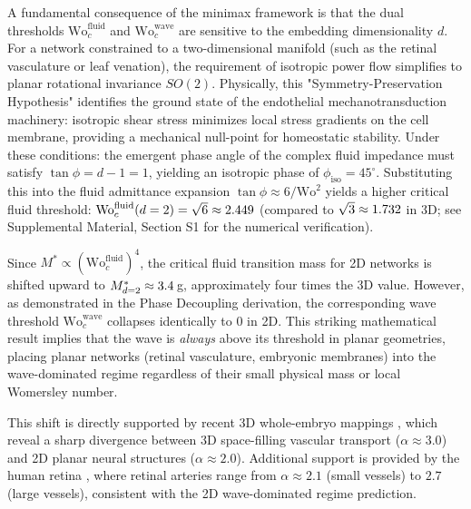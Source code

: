 A fundamental consequence of the minimax framework is that the dual thresholds
$\mathrm{Wo}_c^{\mathrm{fluid}}$ and $\mathrm{Wo}_c^{\mathrm{wave}}$ are
sensitive to the embedding dimensionality $d$. For a network constrained to a
two-dimensional manifold (such as the retinal vasculature or leaf venation), the
requirement of isotropic power flow simplifies to planar rotational invariance
$SO(2)$. Physically, this "Symmetry-Preservation Hypothesis" identifies the
ground state of the endothelial mechanotransduction machinery: isotropic shear
stress minimizes local stress gradients on the cell membrane, providing a
mechanical null-point for homeostatic stability. Under these conditions: the
emergent phase angle of the complex fluid impedance must satisfy $\tan \phi =
d-1 = 1$, yielding an isotropic phase of $\phi_{\mathrm{iso}} = 45^\circ$.
Substituting this into the fluid admittance expansion $\tan\phi \approx
6/\mathrm{Wo}^2$ yields a higher critical fluid threshold:
$\mathrm{Wo}_c^{\mathrm{fluid}}(d=2) = \sqrt{6} \approx 2.449$ (compared to
$\sqrt{3} \approx 1.732$ in 3D; see Supplemental Material, Section S1 for the
numerical verification).

Since $M^* \propto (\mathrm{Wo}_c^{\mathrm{fluid}})^4$, the critical fluid
transition mass for 2D networks is shifted upward to $M^*_{d=2} \approx
3.4\,$g, approximately four times the 3D value. However, as
demonstrated in the Phase Decoupling derivation, the corresponding wave
threshold $\mathrm{Wo}_c^{\mathrm{wave}}$ collapses identically to $0$ in 2D.
This striking mathematical result implies that the wave is \emph{always} above
its threshold in planar geometries, placing planar networks (retinal
vasculature, embryonic membranes) into the wave-dominated regime regardless of
their small physical mass or local Womersley number.

This shift is directly supported by recent 3D whole-embryo mappings
\cite{forjaz2026}, which reveal a sharp divergence between 3D space-filling
vascular transport ($\alpha \approx 3.0$) and 2D planar neural structures
($\alpha \approx 2.0$). Additional support is provided by the human retina
\cite{luo2017}, where retinal arteries range from $\alpha \approx 2.1$ (small
vessels) to $2.7$ (large vessels), consistent with the 2D wave-dominated regime
prediction.

